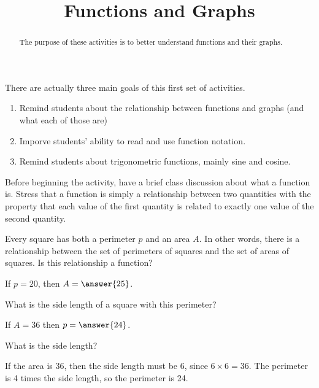 \documentclass{ximera}
\title{Functions and Graphs}
\begin{document}
\begin{abstract}
The purpose of these activities is to better understand functions and their graphs.
\end{abstract}
\maketitle



\begin{instnote}
There are actually three main goals of this first set of activities.

\begin{enumerate}
\item Remind students about the relationship between functions and graphs (and what each of those are)
\item Imporve students' ability to read and use function notation.
\item Remind students about trigonometric functions, mainly sine and cosine.
\end{enumerate}

Before beginning the activity, have a brief class discussion about what a function is.  Stress that a function is simply a relationship between two quantities with the property that each value of the first quantity is related to exactly one value of the second quantity.

\end{instnote}


Every square has both a perimeter $p$ and an area $A$.  In other words, there is a relationship between the set of perimeters of squares and the set of areas of squares.  Is this relationship a function?

\begin{exercise}
If $p = 20$, then $A = \answer{25}$.
\begin{hint}
What is the side length of a square with this perimeter?
\end{hint}
\end{exercise}

\begin{exercise}
If $A = 36$ then $p = \answer{24}$.
\begin{hint}
What is the side length?
\end{hint}

\begin{solution}
If the area is 36, then the side length must be 6, since $6\times 6 = 36$.  The perimeter is 4 times the side length, so the perimeter is 24.
\end{solution}
\end{exercise}
\end{document}
